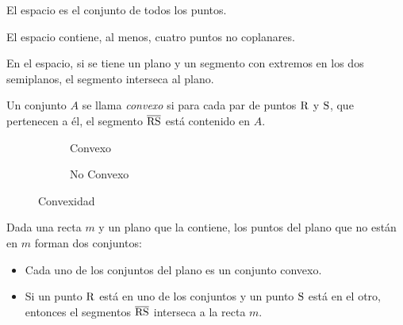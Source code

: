 \begin{definition}
    El espacio es el conjunto de todos los puntos.
\end{definition}

\begin{postulate}
    El espacio contiene, al menos, cuatro puntos no coplanares.
\end{postulate}

\begin{postulate}
    En el espacio, si se tiene un plano y un segmento con extremos en los dos semiplanos, el segmento interseca al plano.
\end{postulate}

\begin{definition}
    Un conjunto $A$ se llama \textit{convexo} si para cada par de puntos $\rm R$ y $\rm S$, que pertenecen a él, el segmento $\overline{\rm RS}$ está contenido en $A$.

    \begin{figure}[h!]

        \centering

        \begin{subfigure}[b]{.5\textwidth}
            \centering
            
            \label{fig:plot24}
            \caption{Convexo}            
        \end{subfigure}%
        \begin{subfigure}[b]{.5\textwidth}
            \centering
            
            \label{fig:plot25}
            \caption{No Convexo}            
        \end{subfigure}
        
        \centering
        \caption{Convexidad}
        \label{fig:convexidad}
    
    \end{figure}
    
\end{definition}

\clearpage

\begin{postulate}
    Dada una recta $m$ y un plano que la contiene, los puntos del plano que no están en $m$ forman dos conjuntos:

    \begin{itemize}
        \item Cada uno de los conjuntos del plano es un conjunto convexo.
        \item Si un punto $\rm R$ está en uno de los conjuntos y un punto $\rm S$ está en el otro, entonces el segmentos $\overline{\rm RS}$ interseca a la recta $m$.
    \end{itemize}
\end{postulate}


